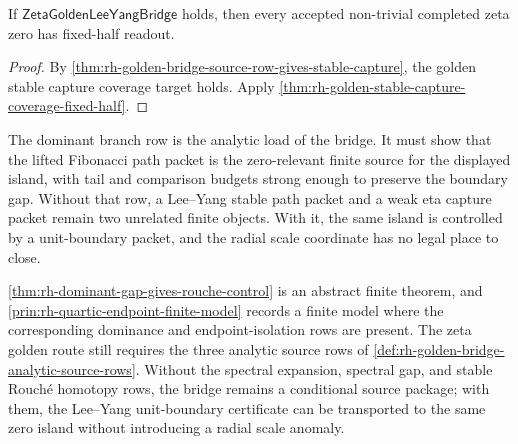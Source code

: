\begin{corollary}
\label{cor:rh-golden-lee-yang-bridge-fixed-half-readout}
If $\mathsf{ZetaGoldenLeeYangBridge}$ holds, then every accepted
non-trivial completed zeta zero has fixed-half readout.
\end{corollary}

\begin{proof}
By \autoref{thm:rh-golden-bridge-source-row-gives-stable-capture},
the golden stable capture coverage target holds.  Apply
\autoref{thm:rh-golden-stable-capture-coverage-fixed-half}.
\end{proof}

\begin{principle}
\label{prin:rh-golden-dominant-branch-source-load}
The dominant branch row is the analytic load of the bridge.  It must
show that the lifted Fibonacci path packet is the zero-relevant finite
source for the displayed island, with tail and comparison budgets strong
enough to preserve the boundary gap.  Without that row, a Lee--Yang
stable path packet and a weak eta capture packet remain two unrelated
finite objects.  With it, the same island is controlled by a
unit-boundary packet, and the radial scale coordinate has no legal
place to close.
\end{principle}

\begin{principle}
\label{prin:rh-stable-bridge-proof-boundary}
\autoref{thm:rh-dominant-gap-gives-rouche-control} is an abstract
finite theorem, and
\autoref{prin:rh-quartic-endpoint-finite-model} records a finite model
where the corresponding dominance and endpoint-isolation rows are
present.  The zeta golden route still requires the three analytic source
rows of \autoref{def:rh-golden-bridge-analytic-source-rows}.  Without
the spectral expansion, spectral gap, and stable Rouch\'e homotopy rows,
the bridge remains a conditional source package; with them, the
Lee--Yang unit-boundary certificate can be transported to the same
zero island without introducing a radial scale anomaly.
\end{principle}

